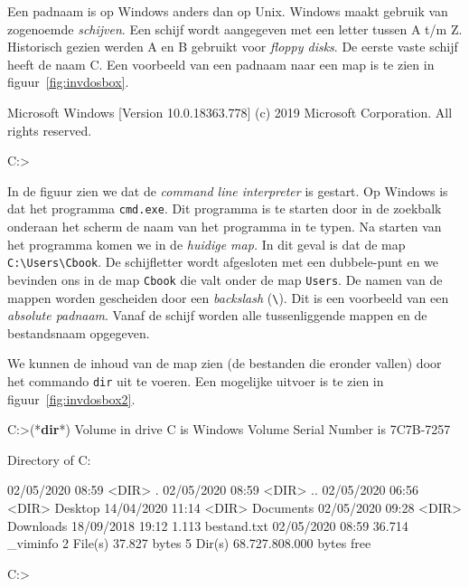 Een padnaam is op Windows anders dan op Unix. Windows maakt gebruik van zogenoemde \textsl{schijven}. Een schijf wordt aangegeven met een letter tussen A t/m Z. Historisch gezien werden A en B gebruikt voor \textsl{floppy disks}. De eerste vaste schijf heeft de naam C. Een voorbeeld van een padnaam naar een map is te zien in figuur~\ref{fig:invdosbox}.

\begin{dosbox}[title=Starten van een DOS-box.,label=fig:invdosbox]
Microsoft Windows [Version 10.0.18363.778]
(c) 2019 Microsoft Corporation. All rights reserved.

C:\Users\Cbook>
\end{dosbox}

In de figuur zien we dat de \textsl{command line interpreter} is gestart. Op Windows is dat het programma \texttt{cmd.exe}. Dit programma is te starten door in de zoekbalk onderaan het scherm de naam van het programma in te typen. Na starten van het programma komen we in de \textsl{huidige map.} In dit geval is dat de map \texttt{C:\textbackslash Users\textbackslash Cbook}. De schijfletter wordt afgesloten met een dubbele-punt en we bevinden ons in de map \texttt{Cbook} die valt onder de map \texttt{Users}. De namen van de mappen worden gescheiden door een \textsl{backslash} (\texttt{\textbackslash}). Dit is een voorbeeld van een \textsl{absolute padnaam}. Vanaf de schijf worden alle tussenliggende mappen en de bestandsnaam opgegeven.

We kunnen de inhoud van de map zien (de bestanden die eronder vallen) door het commando \texttt{dir} uit te voeren. Een mogelijke uitvoer is te zien in figuur~\ref{fig:invdosbox2}.

\begin{dosbox}[title=Uitvoer van het \texttt{dir}-commando.,label=fig:invdosbox2]
C:\Users\Cbook>(*\textbf{dir}*)
 Volume in drive C is Windows
 Volume Serial Number is 7C7B-7257

 Directory of C:\Users\Cbook

02/05/2020  08:59    <DIR>          .
02/05/2020  08:59    <DIR>          ..
02/05/2020  06:56    <DIR>          Desktop
14/04/2020  11:14    <DIR>          Documents
02/05/2020  09:28    <DIR>          Downloads
18/09/2018  19:12             1.113 bestand.txt
02/05/2020  08:59            36.714 _viminfo
              2 File(s)          37.827 bytes
              5 Dir(s)   68.727.808.000 bytes free

C:\Users\Cbook>
\end{dosbox}

